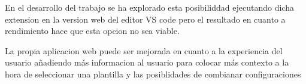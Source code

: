 \documentclass[12pt, a4paper, twoside]{article}
\begin{document}
En el desarrollo del trabajo se ha explorado esta posibiliddad ejecutando dicha extension en la version
web del editor VS code pero el resultado en cuanto a rendimiento hace que esta opcion no sea viable.

La propia aplicacion web puede ser mejorada en cuanto a la experiencia del usuario añadiendo más informacion al usuario para colocar más contexto a la hora de seleccionar una plantilla y las posiblidades de combianar configuraciones 













\printbibliography








\end{document}
